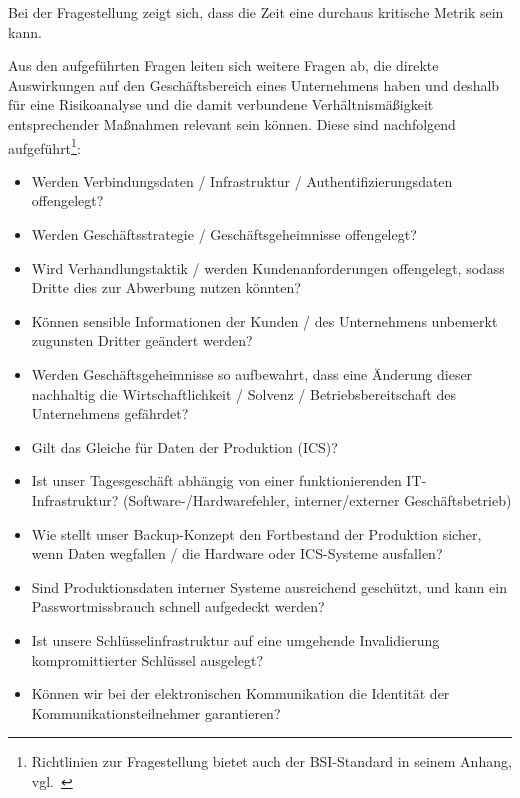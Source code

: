 \noindent
Bei der Fragestellung zeigt sich, dass die Zeit eine durchaus kritische Metrik sein kann.

\noindent
Aus den aufgeführten Fragen leiten sich weitere Fragen ab, die direkte Auswirkungen auf den Geschäftsbereich eines Unternehmens haben und deshalb für eine Risikoanalyse und die damit verbundene Verhältnismäßigkeit entsprechender Maßnahmen relevant sein können. Diese sind nachfolgend aufgeführt\footnote{
Richtlinien zur Fragestellung bietet auch der BSI-Standard in seinem Anhang, vgl.~\cite[173 ff.]{BSI200-2}}:


\begin{itemize}
    \itemsep0.5em
    \item Werden Verbindungsdaten / Infrastruktur / Authentifizierungsdaten offengelegt?
    \item Werden Geschäftsstrategie / Geschäftsgeheimnisse offengelegt?
    \item Wird Verhandlungstaktik / werden Kundenanforderungen offengelegt, sodass Dritte dies zur Abwerbung nutzen könnten?
    \item Können sensible Informationen der Kunden / des Unternehmens unbemerkt zugunsten Dritter geändert werden?
    \item Werden Geschäftsgeheimnisse so aufbewahrt, dass eine Änderung dieser nachhaltig die Wirtschaftlichkeit / Solvenz / Betriebsbereitschaft des Unternehmens gefährdet?
    \item Gilt das Gleiche für Daten der Produktion (ICS)?
    \item Ist unser Tagesgeschäft abhängig von einer funktionierenden IT-Infrastruktur? (Software-/Hardwarefehler, interner/externer Geschäftsbetrieb)
    \item Wie stellt unser Backup-Konzept den Fortbestand der Produktion sicher, wenn Daten wegfallen / die Hardware oder ICS-Systeme ausfallen?
    \item Sind Produktionsdaten interner Systeme ausreichend geschützt, und kann ein Passwortmissbrauch schnell aufgedeckt werden?
    \item Ist unsere Schlüsselinfrastruktur auf eine umgehende Invalidierung kompromittierter Schlüssel ausgelegt?
    \item Können wir bei der elektronischen Kommunikation die Identität der Kommunikationsteilnehmer garantieren?
\end{itemize}